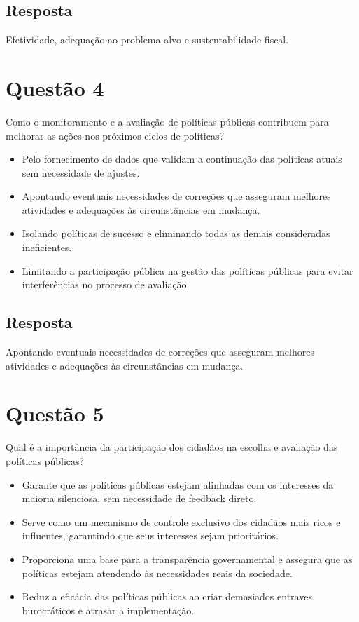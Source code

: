 \documentclass[
   article,       
   12pt,          
   oneside,       
   a4paper,       
   english,       
   brazil,        
   sumario=tradicional
   ]{abntex2}
\begin{document}
\subsection{Resposta}
Efetividade, adequação ao problema alvo e sustentabilidade fiscal.

\section{Questão 4}
Como o monitoramento e a avaliação de políticas públicas contribuem para melhorar as ações nos próximos ciclos de políticas?

\begin{itemize}
  \item Pelo fornecimento de dados que validam a continuação das políticas atuais sem necessidade de ajustes.
  \item Apontando eventuais necessidades de correções que asseguram melhores atividades e adequações às circunstâncias em mudança.
  \item Isolando políticas de sucesso e eliminando todas as demais consideradas ineficientes.
  \item Limitando a participação pública na gestão das políticas públicas para evitar interferências no processo de avaliação.
\end{itemize}

\subsection{Resposta}
Apontando eventuais necessidades de correções que asseguram melhores atividades e adequações às circunstâncias em mudança.

\section{Questão 5}
Qual é a importância da participação dos cidadãos na escolha e avaliação das políticas públicas?

\begin{itemize}
  \item Garante que as políticas públicas estejam alinhadas com os interesses da maioria silenciosa, sem necessidade de feedback direto.
  \item Serve como um mecanismo de controle exclusivo dos cidadãos mais ricos e influentes, garantindo que seus interesses sejam prioritários.
  \item Proporciona uma base para a transparência governamental e assegura que as políticas estejam atendendo às necessidades reais da sociedade.
  \item Reduz a eficácia das políticas públicas ao criar demasiados entraves burocráticos e atrasar a implementação.
\end{itemize}
\end{document}
